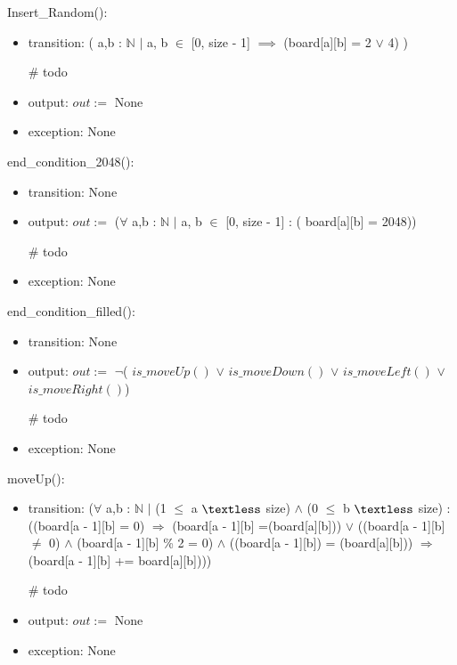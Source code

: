 \documentclass[12pt]{article}
\begin{document}
\noindent Insert\_Random():
\begin{itemize}
\item transition: ( a,b :  $\mathbb{N}$ $\mid$ a, b $\in$ [0, size - 1] $\implies$ (board[a][b] = 2 $\lor$ 4) )\\

\medskip

\# todo
\item output: $out :=$ None
\item exception: None
\end{itemize}

\noindent end\_condition\_2048():
\begin{itemize}
\item transition: None
\item output: $out :=$  ($\forall$ a,b :  $\mathbb{N}$ $\mid$ a, b $\in$ [0, size - 1] : ( board[a][b] = 2048))\\

\medskip

\# todo
\item exception: None
\end{itemize}

\noindent end\_condition\_filled():
\begin{itemize}
\item transition: None
\item output: $out :=$  $\lnot$( $is\_moveUp()$ $\lor$  $is\_moveDown()$ $\lor$ $ is\_moveLeft()$ $\lor$ $ is\_moveRight()$) 

\medskip

\# todo
\item exception: None
\end{itemize}

\noindent moveUp():
\begin{itemize}
\item transition: ($\forall$ a,b :  $\mathbb{N}$ $\mid$ (1 $\le$ a $\textless$ size) $\land$ (0 $\le$ b $\textless$ size)   : ((board[a - 1][b] = 0)  $\Rightarrow$  (board[a - 1][b] =(board[a][b])) 
$\lor$ ((board[a - 1][b] $\neq$ 0) $\land$ (board[a - 1][b] \% 2 = 0) $\land$ ((board[a - 1][b]) = (board[a][b])) $\Rightarrow$ (board[a - 1][b] += board[a][b])))\\

\medskip

\# todo
\item output: $out :=$ None
\item exception: None
\end{itemize}
\end{document}

